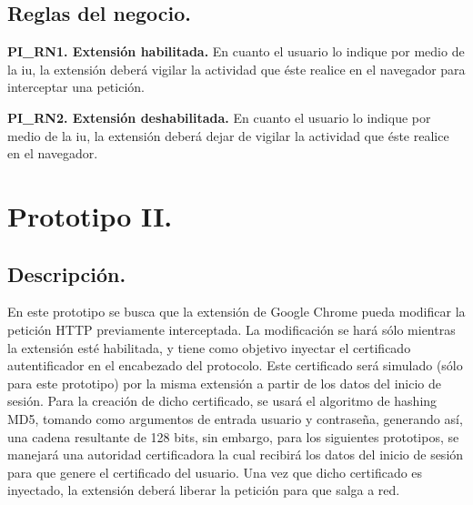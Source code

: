 \documentclass[12pt, a4paper, titlepage]{report}
\begin{document}
			\subsection{Reglas del negocio.}
				{\setlength{\parindent}{12pt}
			
				\textbf{PI\_RN1. Extensión habilitada.} En cuanto el usuario lo indique por medio de la \acrlong{iu}, la extensión deberá vigilar la actividad que éste realice en el navegador para interceptar una petición.\\
				\label{PI_RN1}
				
				\textbf{PI\_RN2. Extensión deshabilitada.} En cuanto el usuario lo indique por medio de la \acrlong{iu}, la extensión deberá dejar de vigilar la actividad que éste realice en el navegador.
				\label{PI_RN2}
				}
				
                \newpage
                
		
		\section{Prototipo II.}
		    \subsection{Descripción.}
		    En este prototipo se busca que la extensión de Google Chrome pueda modificar la petición HTTP previamente interceptada. La modificación se hará sólo mientras la extensión esté habilitada, y tiene como objetivo inyectar el certificado autentificador en el encabezado del protocolo. Este certificado será simulado (sólo para este prototipo) por la misma extensión a partir de los datos del inicio de sesión. Para la creación de dicho certificado, se usará el algoritmo de hashing MD5, tomando como argumentos de entrada usuario y contraseña, generando así, una cadena resultante de 128 bits, sin embargo, para los siguientes prototipos, se manejará una autoridad certificadora la cual recibirá los datos del inicio de sesión para que genere el certificado del usuario. Una vez que dicho certificado es inyectado, la extensión deberá liberar la petición para que salga a red.\\
		    
\end{document}

